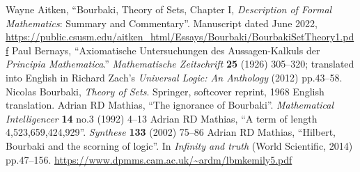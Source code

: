 \documentclass{amsart}%
\begin{document}
\begin{thebibliography}{99}
 Wayne Aitken,
  ``Bourbaki, Theory of Sets, Chapter I, \textit{Description of Formal Mathematics}: Summary and Commentary''.
  Manuscript dated June 2022,
  \url{https://public.csusm.edu/aitken_html/Essays/Bourbaki/BourbakiSetTheory1.pdf}
 Paul Bernays, ``Axiomatische Untersuchungen des
Aussagen-Kalkuls der \textit{Principia Mathematica}.''
\textit{Mathematische Zeitschrift} \textbf{25} (1926) 305--320;
translated into English in Richard Zach's \textit{Universal Logic: An
  Anthology} (2012) pp.43--58.
 Nicolas Bourbaki,
  \textit{Theory of Sets}.
  Springer, softcover reprint, 1968 English translation.
  Adrian RD Mathias,
  ``The ignorance of Bourbaki''.
  \textit{Mathematical Intelligencer} \textbf{14} no.3 (1992) 4--13
  Adrian RD Mathias,
  ``A term of length 4,523,659,424,929''.
  \textit{Synthese} \textbf{133} (2002) 75--86
  Adrian RD Mathias,
  ``Hilbert, Bourbaki and the scorning of logic''.
  In \textit{Infinity and truth} (World Scientific, 2014) pp.47--156.
  \url{https://www.dpmms.cam.ac.uk/~ardm/lbmkemily5.pdf}

\end{thebibliography}
\end{document}
